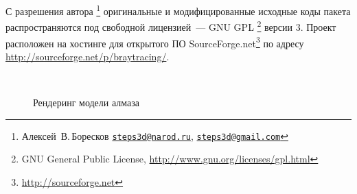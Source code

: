 \documentclass[a4paper,10pt]{article}
\newcommand{\myemail}[1]{%
\href{mailto:#1}{\nolinkurl{#1}}}
\begin{document}
С разрешения автора%
\footnote{Алексей~В.\,Боресков \myemail{steps3d@narod.ru}, \myemail{steps3d@gmail.com}}
оригинальные и модифицированные исходные коды пакета распространяются под свободной лицензией~--- GNU GPL%
\footnote{GNU General Public License, \url{http://www.gnu.org/licenses/gpl.html}} версии 3. 
Проект расположен на хостинге для открытого ПО SourceForge.net\footnote{\url{http://sourceforge.net}} по адресу
\url{http://sourceforge.net/p/braytracing/}.

\begin{figure}
  \centering
  \\
  \caption{Рендеринг модели алмаза}
  \label{fig:diamond-results}
\end{figure}



\end{document}
